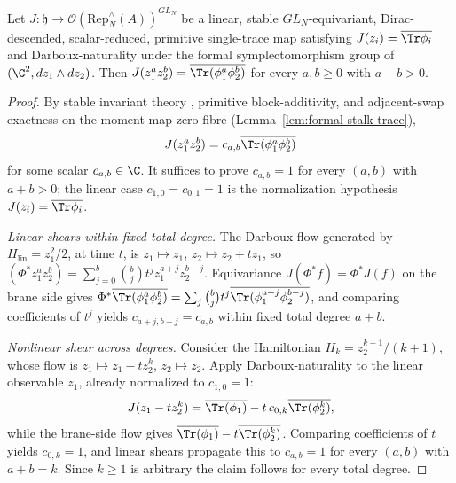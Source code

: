 \begin{thm}
\label{thm:completion-shear-forcing}
Let \(J:\mathfrak h\to\mathcal O(\mathrm{Rep}^\wedge_N(A))^{GL_N}\) be
a linear, stable \(GL_N\)-equivariant, Dirac-descended,
scalar-reduced, primitive single-trace map satisfying
\(J(z_i)=\overline{\Tr\phi_i}\) and Darboux-naturality under the
formal symplectomorphism group of \((\C^2,dz_1\wedge dz_2)\).  Then
\(J(z_1^az_2^b)=\overline{\Tr(\phi_1^a\phi_2^b)}\) for every
\(a,b\ge 0\) with \(a+b>0\).
\end{thm}

\begin{proof}
By stable invariant theory \cite{procesi}\cite{razmyslov}, primitive block-additivity, and
adjacent-swap exactness on the moment-map zero fibre
(Lemma~\ref{lem:formal-stalk-trace}),
\[
  J(z_1^az_2^b)=c_{a,b}\overline{\Tr(\phi_1^a\phi_2^b)}
\]
for some scalar \(c_{a,b}\in\C\).  It suffices to prove
\(c_{a,b}=1\) for every \((a,b)\) with \(a+b>0\); the linear case
\(c_{1,0}=c_{0,1}=1\) is the normalization hypothesis
\(J(z_i)=\overline{\Tr\phi_i}\).

\emph{Linear shears within fixed total degree.}  The Darboux flow
generated by \(H_{\mathrm{lin}}=z_1^2/2\), at time \(t\), is
\(z_1\mapsto z_1\), \(z_2\mapsto z_2+tz_1\), so
\((\Phi^*z_1^az_2^b)=\sum_{j=0}^b\binom{b}{j}t^jz_1^{a+j}z_2^{b-j}\).
Equivariance \(J(\Phi^*f)=\Phi^*J(f)\) on the brane side gives
\(\Phi^*\overline{\Tr(\phi_1^a\phi_2^b)}=\sum_{j}\binom{b}{j}t^j
\overline{\Tr(\phi_1^{a+j}\phi_2^{b-j})}\), and comparing
coefficients of \(t^j\) yields
\(c_{a+j,b-j}=c_{a,b}\) within fixed total degree \(a+b\).

\emph{Nonlinear shear across degrees.}  Consider the Hamiltonian
\(H_k=z_2^{k+1}/(k+1)\), whose flow is
\(z_1\mapsto z_1-tz_2^k\), \(z_2\mapsto z_2\).  Apply
Darboux-naturality to the linear observable \(z_1\), already
normalized to \(c_{1,0}=1\):
\[
  J(z_1-tz_2^k)
  =\overline{\Tr(\phi_1)}
  -t\,c_{0,k}\overline{\Tr(\phi_2^k)} ,
\]
while the brane-side flow gives
\(\overline{\Tr(\phi_1)}-t\overline{\Tr(\phi_2^k)}\).  Comparing
coefficients of \(t\) yields \(c_{0,k}=1\), and linear shears
propagate this to \(c_{a,b}=1\) for every \((a,b)\) with \(a+b=k\).
Since \(k\ge 1\) is arbitrary the claim follows for every total
degree.
\end{proof}

